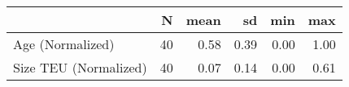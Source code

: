 
\begin{tabular}[t]{lrrrrr}
\toprule
  & N & mean & sd & min & max\\
\midrule
Age (Normalized) & 40 & 0.58 & 0.39 & 0.00 & 1.00\\
Size TEU (Normalized) & 40 & 0.07 & 0.14 & 0.00 & 0.61\\
\bottomrule
\end{tabular}
